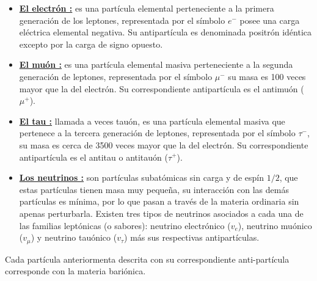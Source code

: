 \begin{itemize}
    \item \href{https://es.wikipedia.org/wiki/Electr\%C3\%B3n}{\textbf{El electrón :}} es una partícula elemental perteneciente a la primera generación de los leptones, representada por el símbolo $e^-$ posee una carga eléctrica elemental negativa. Su antipartícula es denominada positrón idéntica excepto por la carga de signo opuesto.
    
    \item \href{https://es.wikipedia.org/wiki/Muon}{\textbf{El muón :}} 
     es una partícula elemental masiva perteneciente a la segunda generación de leptones, representada por el símbolo $\mu^-$ su masa es 100 veces mayor que la del electrón. Su correspondiente antipartícula es el antimuón ($\mu^+$).
    
    \item \href{https://es.wikipedia.org/wiki/Tau_(part\%C3\%ADcula)}{\textbf{El tau :}} llamada a veces tauón, es una partícula elemental masiva que pertenece a la tercera generación de leptones, representada por el símbolo $\tau^-$, su masa es cerca de 3500 veces mayor que la del electrón. Su correspondiente antipartícula es el antitau o antitauón ($\tau^+$).
    
    \item \href{https://es.wikipedia.org/wiki/Neutrino}{\textbf{Los neutrinos :}}
    son partículas subatómicas sin carga y de espín $1/2$, que estas partículas tienen masa muy pequeña, su interacción con las demás partículas es mínima, por lo que pasan a través de la materia ordinaria sin apenas perturbarla. Existen tres tipos de neutrinos asociados a cada una de las familias leptónicas (o sabores): neutrino electrónico ($v_e$), neutrino muónico ($v_\mu$) y neutrino tauónico ($v_\tau$) más sus respectivas antipartículas.

\end{itemize}

Cada partícula anteriormenta descrita con su correspondiente anti-partícula corresponde con la materia bari\'onica.
